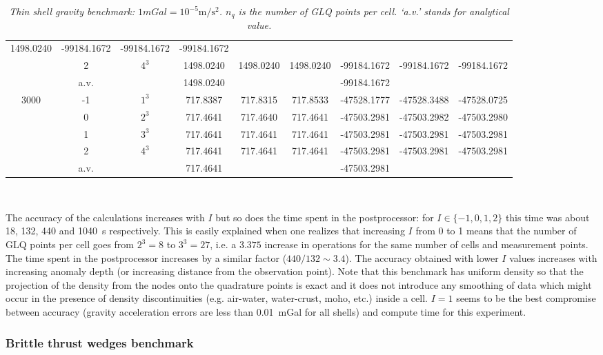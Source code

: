 \documentclass{article}
\begin{document}
\begin{table}[htb]
\begin{tabular}{|c|c|c|ccc|ccc|}
1498.0240 &
-99184.1672 &
-99184.1672 &
-99184.1672 \\
& 2 & $4^3$ &
1498.0240 &
1498.0240 &
1498.0240 &
-99184.1672 &
-99184.1672 &
-99184.1672 \\
& a.v. && 1498.0240 &&& -99184.1672 &&\\
\hline\hline
3000 &-1 & $1^3$ &
717.8387 &
717.8315 &
717.8533 &
-47528.1777 &
-47528.3488 &
-47528.0725 \\
 & 0 & $2^3$ &
717.4641 &
717.4640 &
717.4641 &
-47503.2981 &
-47503.2982 &
-47503.2980 \\
 & 1 & $3^3$ &
717.4641 &
717.4641 &
717.4641 &
-47503.2981 &
-47503.2981 &
-47503.2981 \\
& 2 & $4^3$ &
717.4641 &
717.4641 &
717.4641 &
-47503.2981 &
-47503.2981 &
-47503.2981 \\
&{\small a.v.} && 717.4641 &&& -47503.2981 && \\
\hline
\end{tabular}\\
\caption{\it Thin shell gravity benchmark: $1\si{mGal}=10^{-5}\si{\meter\per\square\second}$. $n_q$ is the number of GLQ points per cell. `a.v.' stands for analytical value.}
\label{tab:thin_shell_gravity_benchmark}
\end{table}

The accuracy of the calculations increases with $I$ but so does the time spent in the postprocessor: for $I\in\{-1,0,1,2\}$  this time was about 18, 132, 440 and 1040~\si{s} respectively. This is easily explained when one realizes that increasing $I$ from 0 to 1 means that the number of GLQ points per cell goes from $2^3=8$ to $3^3=27$, i.e. a $3.375$ increase in operations for the same number of cells and measurement points. The time spent in the postprocessor increases by a similar factor ($440/132\sim 3.4$).
The accuracy obtained with lower $I$ values increases with increasing anomaly depth (or increasing distance from the observation point). Note that this benchmark has uniform density so that the projection of the density from the nodes onto the quadrature points is exact and it does not introduce any smoothing of data which might occur in the presence of density discontinuities (e.g. air-water, water-crust, moho, etc.) inside a cell. $I=1$ seems to be the best compromise between accuracy (gravity acceleration errors are less than 0.01~mGal for all shells) and compute time for this experiment.

\subsubsection{Brittle thrust wedges benchmark}
\label{sec:benchmark-brittle-thrust-wedge}
\end{document}
